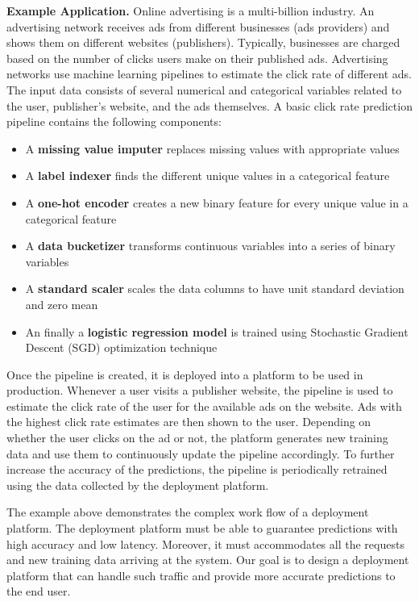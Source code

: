 \documentclass[10pt,conference,letterpaper]{IEEEtran}
\begin{document}
\textbf{Example Application.} 
Online advertising is a multi-billion industry.
An advertising network receives ads from different businesses (ads providers) and shows them on different websites (publishers).
Typically, businesses are charged based on the number of clicks users make on their published ads.
Advertising networks use machine learning pipelines to estimate the click rate of different ads.
The input data consists of several numerical and categorical variables related to the user, publisher's website, and the ads themselves.
A basic click rate prediction pipeline contains the following components:
\begin{itemize}
\item A \textbf{missing value imputer} replaces missing values with appropriate values
\item A \textbf{label indexer} finds the different unique values in a categorical feature 
\item A \textbf{one-hot encoder} creates a new binary feature for every unique value in a categorical feature
\item A \textbf{data bucketizer} transforms continuous variables into a series of binary variables
\item A \textbf{standard scaler} scales the data columns to have unit standard deviation and zero mean
\item An finally a \textbf{logistic regression model} is trained using Stochastic Gradient Descent (SGD) optimization technique
\end{itemize}
Once the pipeline is created, it is deployed into a platform to be used in production.
Whenever a user visits a publisher website, the pipeline is used to estimate the click rate of the user for the available ads on the website.
Ads with the highest click rate estimates are then shown to the user.
Depending on whether the user clicks on the ad or not, the platform generates new training data and use them to continuously update the pipeline accordingly. 
To further increase the accuracy of the predictions, the pipeline is periodically retrained using the data collected by the deployment platform.

The example above demonstrates the complex work flow of a deployment platform.
The deployment platform must be able to guarantee predictions with high accuracy and low latency.
Moreover, it must accommodates all the requests and new training data arriving at the system. 
Our goal is to design a deployment platform that can handle such traffic and provide more accurate predictions to the end user.
\end{document}

